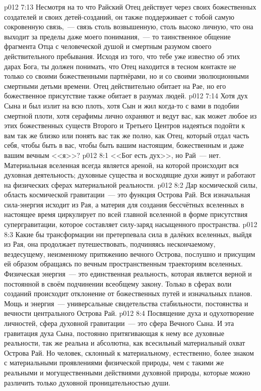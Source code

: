 \vs p012 7:13 \pc Несмотря на то что Райский Отец действует через своих божественных создателей и своих детей\hyp{}созданий, он также поддерживает с тобой самую сокровенную связь,~--- связь столь возвышенную, столь высоко личную, что она выходит за пределы даже моего понимания,~--- то таинственное общение фрагмента Отца с человеческой душой и смертным разумом своего действительного пребывания. Исходя из того, что тебе уже известно об этих дарах Бога, ты должен понимать, что Отец находится в тесном контакте не только со своими божественными партнёрами, но и со своими эволюционными смертными детьми времени. Отец действительно обитает на Рае, но его божественное присутствие также обитает в разумах людей.
\vs p012 7:14 Хотя дух Сына и был излит на всю плоть, хотя Сын и жил когда\hyp{}то с вами в подобии смертной плоти, хотя серафимы лично охраняют и ведут вас, как может любое из этих божественных существ Второго и Третьего Центров надеяться подойти к вам так же близко или понять вас так же полно, как Отец, который отдал часть себя, чтобы быть в вас, чтобы быть вашим настоящим, божественным и даже вашим вечным <<я>>?
\vs p012 8:1 <<Бог есть дух>>, но Рай~--- нет. Материальная вселенная всегда является ареной, на которой происходит вся духовная деятельность; духовные существа и восходящие духи живут и работают на физических сферах материальной реальности.
\vs p012 8:2 \pc Дар космической силы, область космической гравитации~--- это функция Острова Рай. Вся изначальная сила\hyp{}энергия исходит из Рая, а материя для создания бессчётных вселенных в настоящее время циркулирует по всей главной вселенной в форме присутствия супергравитации, которое составляет силу\hyp{}заряд насыщенного пространства.
\vs p012 8:3 Какие бы трансформации ни претерпевала сила в далёких вселенных, выйдя из Рая, она продолжает путешествовать, подчиняясь нескончаемому, вездесущему, неизменному притяжению вечного Острова, послушно и присущим ей образом обращаясь по вечным пространственным траекториям вселенных. Физическая энергия~--- это единственная реальность, которая является верной и постоянной в своём подчинении всеобщему закону. Только в сферах воли созданий происходит отклонение от божественных путей и изначальных планов. Мощь и энергия~--- универсальные свидетельства стабильности, постоянства и вечности центрального Острова Рай.
\vs p012 8:4 \pc Посвящение духа и одухотворение личностей, сфера духовной гравитации~--- это сфера Вечного Сына. И эта гравитация духа Сына, постоянно притягивающая к нему все духовные реальности, так же реальна и абсолютна, как всесильный материальный охват Острова Рай. Но человек, склонный к материальному, естественно, более знаком с материальными проявлениями физической природы, чем с такими же реальными и могущественными действиями духовной природы, которые можно различить только духовной проницательностью души.
